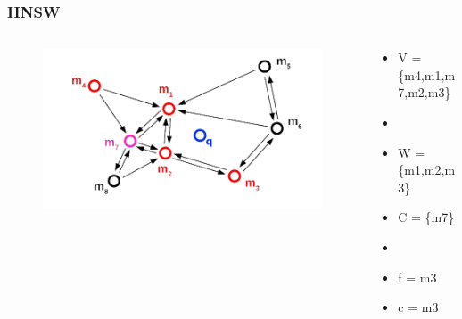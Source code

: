 \documentclass{beamer}
\begin{document}
	\begin{frame}
		\frametitle{HNSW}
		\begin{columns}[T] %
			\begin{column}{.6\textwidth}
				\begin{figure}
					\includegraphics[scale=0.3]{figures/HNSW_b9.png}
				\end{figure}
			\end{column}%
			\hfill%
			\begin{column}{.4\textwidth}
				\begin{itemize}
					\item V = \{m4,m1,m7,m2,m3\}
					\item[]
					\item W = \{m1,m2,m3\}
					\item C = \{m7\}
					\item[]
					\item f = m3
					\item c = m3
				\end{itemize}
			\end{column}%
		\end{columns}
	\end{frame}
\end{document}
